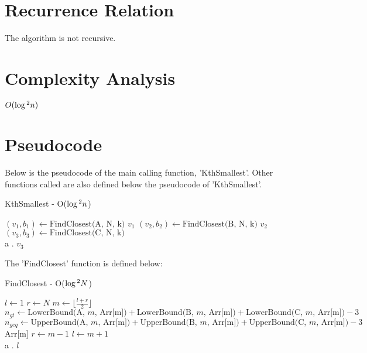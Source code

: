 \documentclass{article}
\begin{document}
\section{Recurrence Relation}
The algorithm is not recursive.

\section{Complexity Analysis}
$O(\log \textsuperscript{2} n)$

\section{Pseudocode}

Below is the pseudocode of the main calling function, 'KthSmallest'. Other functions called are also defined below the pseudocode of 'KthSmallest'.

\begin{algorithm}[H]
\begin{algorithmic}[1]

\caption{KthSmallest - O($\log \textsuperscript{2} n$)}


    \State $(v_1, b_1) \gets \text{FindClosest(A, N, k)}$
        \Return $v_1$
    \EndIf
    \State $(v_2, b_2) \gets \text{FindClosest(B, N, k)}$
        \Return $v_2$
    \EndIf
    \State $(v_3, b_3) \gets \text{FindClosest(C, N, k)}$
    \\ \phantom a \phantom . \Return $v_3$
\EndFunction

\end{algorithmic}
\end{algorithm}

The 'FindClosest' function is defined below: 

\begin{algorithm}[H]
\begin{algorithmic}[1]

\caption{FindClosest - O($\log \textsuperscript{2} N$)}

    \State $l \gets 1$ 
    \State $r \gets N$ 
        \State $m \gets \lfloor \frac{l+r}{2} \rfloor$
        \State $n_{gt} \gets \text{LowerBound(A, $m$, Arr[m])} + \text{LowerBound(B, $m$, Arr[m])} + \text{LowerBound(C, $m$, Arr[m])} - 3$
        \State $n_{geq} \gets \text{UpperBound(A, $m$, Arr[m])} + \text{UpperBound(B, $m$, Arr[m])} + \text{UpperBound(C, $m$, Arr[m])} - 3$
                \Return Arr[m]
            \Else
                \State $r \gets m-1$
            \EndIf
        \Else
            \State $l \gets m+1$
        \EndIf
    \EndWhile \\
    \phantom a \phantom .
    \Return $l$
\EndFunction

\end{algorithmic}
\end{algorithm}
\end{document}
